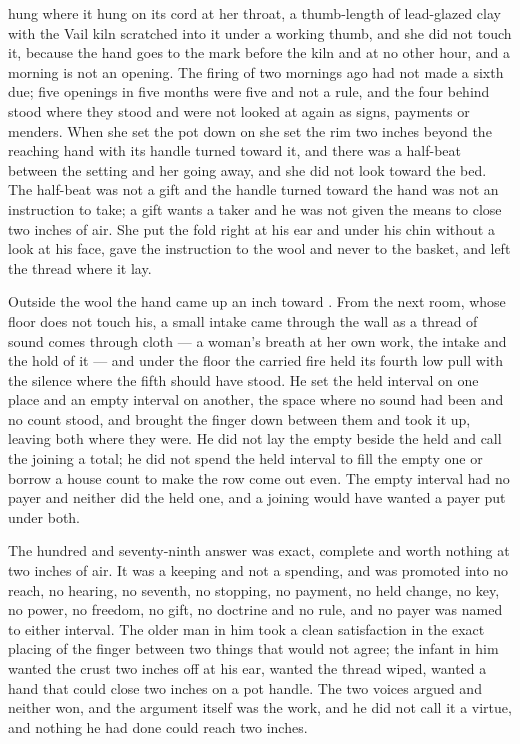 hung where it hung on its cord at her throat, a thumb-length of lead-glazed clay with the Vail kiln scratched into it under a working thumb, and she did not touch it, because the hand goes to the mark before the kiln and at no other hour, and a morning is not an opening. The firing of two mornings ago had not made a sixth due; five openings in five months were five and not a rule, and the four behind stood where they stood and were not looked at again as signs, payments or menders. When she set the pot down on  she set the rim two inches beyond the reaching hand with its handle turned toward it, and there was a half-beat between the setting and her going away, and she did not look toward the bed. The half-beat was not a gift and the handle turned toward the hand was not an instruction to take; a gift wants a taker and he was not given the means to close two inches of air. She put the fold right at his ear and under his chin without a look at his face, gave the instruction to the wool and never to the basket, and left the thread where it lay.

Outside the wool the hand came up an inch toward . From the next room, whose floor does not touch his, a small intake came through the wall as a thread of sound comes through cloth --- a woman's breath at her own work, the intake and the hold of it --- and under the floor the carried fire held its fourth low pull with the silence where the fifth should have stood. He set the held interval on one place and an empty interval on another, the space where no sound had been and no count stood, and brought the finger down between them and took it up, leaving both where they were. He did not lay the empty beside the held and call the joining a total; he did not spend the held interval to fill the empty one or borrow a house count to make the row come out even. The empty interval had no payer and neither did the held one, and a joining would have wanted a payer put under both.

The hundred and seventy-ninth answer was exact, complete and worth nothing at two inches of air. It was a keeping and not a spending, and was promoted into no reach, no hearing, no seventh, no stopping, no payment, no held change, no key, no power, no freedom, no gift, no doctrine and no rule, and no payer was named to either interval. The older man in him took a clean satisfaction in the exact placing of the finger between two things that would not agree; the infant in him wanted the crust two inches off at his ear, wanted the thread wiped, wanted a hand that could close two inches on a pot handle. The two voices argued and neither won, and the argument itself was the work, and he did not call it a virtue, and nothing he had done could reach two inches.

